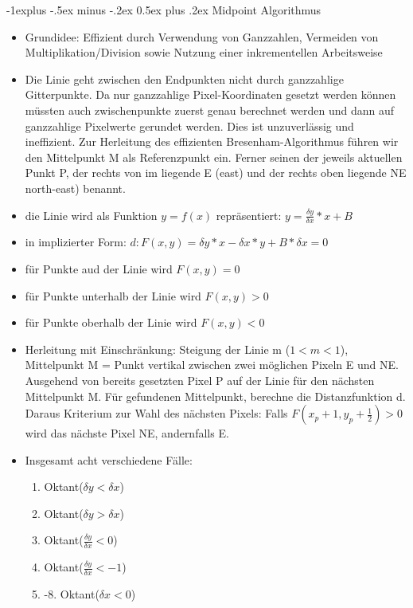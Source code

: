 \documentclass[10pt,landscape]{article}
\makeatletter
\renewcommand{\subsection}{\@startsection{subsection}{2}{0mm}%
                                {-1explus -.5ex minus -.2ex}%
                                {0.5ex plus .2ex}%
                                {\normalfont\normalsize\bfseries}}
\makeatother
\begin{document}
\begin{multicols}{3}
\subsection{ Midpoint Algorithmus}
\begin{itemize}
  \item Grundidee: Effizient durch Verwendung von Ganzzahlen, Vermeiden von Multiplikation/Division sowie Nutzung einer inkrementellen Arbeitsweise
  \item Die Linie geht zwischen den Endpunkten nicht durch ganzzahlige Gitterpunkte. Da nur ganzzahlige Pixel-Koordinaten gesetzt werden können müssten auch zwischenpunkte zuerst genau berechnet werden und dann auf ganzzahlige Pixelwerte gerundet werden. Dies ist unzuverlässig und ineffizient. Zur Herleitung des effizienten Bresenham-Algorithmus führen wir den Mittelpunkt M als Referenzpunkt ein. Ferner seinen der jeweils aktuellen Punkt P, der rechts von im liegende E (east) und der rechts oben liegende NE north-east) benannt.
  \item die Linie wird als Funktion $y=f(x)$ repräsentiert: $y=\frac{\delta y}{\delta x}*x+B$
  \item in implizierter Form: $d: F(x,y)=\delta y*x-\delta x*y+B*\delta x = 0$
  \item für Punkte aud der Linie wird $F(x,y)=0$
  \item für Punkte unterhalb der Linie wird $F(x,y)>0$
  \item für Punkte oberhalb der Linie wird $F(x,y)<0$
  \item Herleitung mit Einschränkung: Steigung der Linie m ($1 < m < 1$), Mittelpunkt M = Punkt vertikal zwischen zwei möglichen Pixeln E und NE. Ausgehend von bereits gesetzten Pixel P auf der Linie für den nächsten Mittelpunkt M. Für gefundenen Mittelpunkt, berechne die Distanzfunktion d. Daraus Kriterium zur Wahl des nächsten Pixels: Falls $F(x_p + 1, y_p+\frac{1}{2})>0$ wird das nächste Pixel NE, andernfalls E.
  \item Insgesamt acht verschiedene Fälle:
        \begin{enumerate}
          \item Oktant($\delta y < \delta x$)
          \item Oktant($\delta y > \delta x$)
          \item Oktant($\frac{\delta y}{\delta x}<  0$)
          \item Oktant($\frac{\delta y}{\delta x}< -1$)
          \item -8. Oktant($\delta x < 0$)
        \end{enumerate}
\end{itemize}


\end{multicols}
\end{document}
